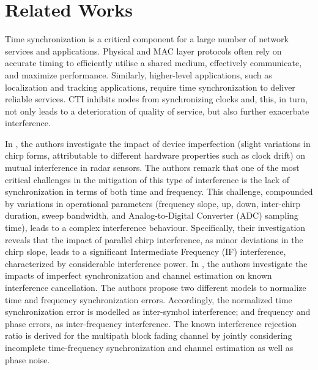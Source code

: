 \section{ Related Works} 
\label{sec: related}

Time synchronization is a critical component for a large number of network services and applications. Physical and MAC layer protocols often rely on accurate timing to efficiently utilise a shared medium, effectively communicate, and maximize performance. Similarly, higher-level applications, such as localization and tracking applications, require time synchronization to deliver reliable services. CTI inhibits nodes from synchronizing clocks and, this, in turn, not only leads to a deterioration of quality of service, but also further exacerbate interference.

In \cite{Reitz_FMCW_interference_2024}, the authors investigate the impact of device imperfection (slight variations in chirp forms, attributable to different hardware properties such as clock drift) on mutual interference in radar sensors. The authors remark that one of the most critical challenges in the mitigation of this type of interference is the lack of synchronization in terms of both time and frequency. This challenge, compounded by variations in operational parameters (frequency slope, up, down, inter-chirp duration, sweep bandwidth, and Analog-to-Digital Converter (ADC) sampling time), leads to a complex interference behaviour. Specifically, their investigation reveals that the impact of parallel chirp interference, as minor deviations in the chirp slope, leads to a significant Intermediate Frequency (IF) interference, characterized by considerable interference power. In \cite{guo_imperfect_synchronization_2020}, the authors investigate the impacts of imperfect synchronization and channel estimation on known interference cancellation. The authors propose two different models to normalize time and frequency synchronization errors. Accordingly, the normalized time synchronization error is modelled as inter-symbol interference; and frequency and phase errors, as inter-frequency interference. The known interference rejection ratio is derived for the multipath block fading channel by jointly considering incomplete time-frequency synchronization and channel estimation as well as phase noise.

